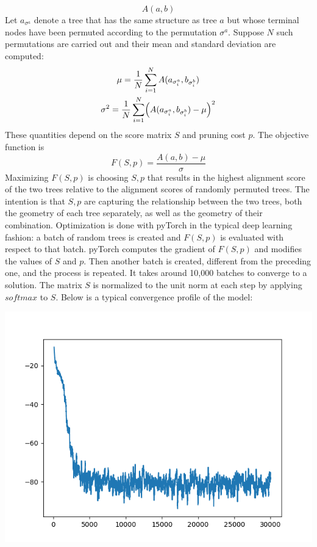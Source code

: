\documentclass[12pt]{article}
\begin{document}
\begin{equation*}
  A(a,b)
\end{equation*}
Let \(a_{\sigma^a}\) denote a tree that has the same structure as tree \(a\) but whose terminal nodes have been permuted according to the permutation \(\sigma^a\). Suppose \(N\) such permutations are carried out and their mean and standard deviation are computed:
\begin{gather*}
  \mu = {\frac 1 N} \sum_{i=1}^N A(a_{\sigma^a_i},b_{\sigma^b_i}) \\
  \sigma^2 = {\frac 1 N} \sum_{i=1}^N  \Bigl( A(a_{\sigma^a_i},b_{\sigma^b_i}) - \mu \Bigr)^2 \\
\end{gather*}
These quantities depend on the score matrix \(S\) and pruning cost \(p\). The objective function is
\begin{equation*}
  F(S,p) = {\frac { A(a,b)-\mu} \sigma}
\end{equation*}
Maximizing \(F(S,p)\) is choosing \(S,p\) that results in the highest alignment score of the two trees relative to the alignment scores of randomly permuted trees. The intention is that \(S,p\) are capturing the relationship between the two trees, both the geometry of each tree separately, as well as the geometry of their combination. Optimization is done with pyTorch in the typical deep learning fashion: a batch of random trees is created and \(F(S,p)\) is evaluated with respect to that batch. pyTorch computes the gradient of \(F(S,p)\) and modifies the values of \(S\) and \(p\). Then another batch is created, different from the preceding one, and the process is repeated. It takes around 10,000 batches to converge to a solution. The matrix \(S\) is normalized to the unit norm at each step by applying \(softmax\) to \(S\). Below is a typical convergence profile of the model:

\includegraphics[width=\textwidth]{ave_loss.png}
\end{document}
